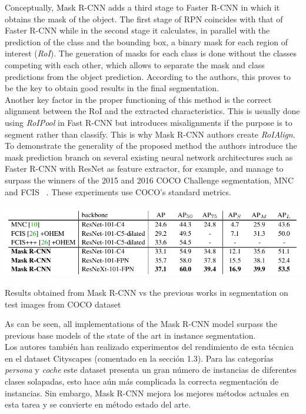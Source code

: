 \documentclass{bmvc2k}
\begin{document}
Conceptually, Mask R-CNN adds a third stage to Faster R-CNN in which it obtains the mask of the object. The first stage of RPN coincides with that of Faster R-CNN while in the second stage it calculates, in parallel with the prediction of the class and the bounding box, a binary mask for each region of interest (\textit{RoI}). The generation of masks for each class is done without the classes competing with each other, which allows to separate the mask and class predictions from the object prediction. According to the authors, this proves to be the key to obtain good results in the final segmentation.\\ 
Another key factor in the proper functioning of this method is the correct alignment between the RoI and the extracted characteristics. This is usually done using \textit{RoIPool} in Fast R-CNN but introduces misalignments if the purpose is to segment rather than classify. This is why Mask R-CNN authors create \textit{RoIAlign}. To demonstrate the generality of the proposed method the authors introduce the mask prediction branch on several existing neural network architectures such as Faster R-CNN with ResNet as feature extractor, for example, and manage to surpass the winners of the 2015 and 2016 COCO Challenge segmentation, MNC ~\cite{dai2016instance} and FCIS ~\cite{li2016fully}. These experiments use COCO's standard metrics.\\
\begin{table}[h!]
\begin{center}
\includegraphics[scale=0.40]{mask_vs_mnc_fcis.png}
\caption{Results obtained from Mask R-CNN vs the previous works in segmentation on test images from COCO dataset}
\end{center}
\end{table}
As can be seen, all implementations of the Mask R-CNN model surpass the previous base models of the state of the art in instance segmentation.\\
Los autores también han realizado experimentos del rendimiento de esta técnica en el dataset Cityscapes (comentado en la sección 1.3). Para las categorías \textit{persona} y \textit{coche} este dataset presenta un gran número de instancias de diferentes clases solapadas, esto hace aún más complicada la correcta segmentación de instancias. Sin embargo, Mask R-CNN mejora los mejores métodos actuales en esta tarea y se convierte en método estado del arte. %
\end{document}
